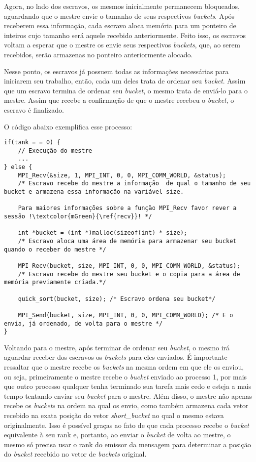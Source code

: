 			Agora, no lado dos escravos, os mesmos inicialmente permanecem bloqueados, aguardando que o mestre envie o tamanho de seus respectivos \textit{buckets}. Após receberem essa informação, cada escravo aloca memória para um ponteiro de inteiros cujo tamanho será aquele recebido anteriormente. Feito isso, os escravos voltam a esperar que o mestre os envie seus respectivos \textit{buckets}, que, ao serem recebidos, serão armazenas no ponteiro anteriormente alocado.
			
			Nesse ponto, os escravos já possuem todas as informações necessárias para iniciarem seu trabalho, então, cada um deles trata de ordenar seu \textit{bucket}. Assim que um escravo termina de ordenar seu \textit{bucket}, o mesmo trata de enviá-lo para o mestre. Assim que recebe a confirmação de que o mestre recebeu o \textit{bucket}, o escravo é finalizado.
			
			O código abaixo exemplifica esse processo:
			\begin{lstlisting}[style=C]		
if(tank = = 0) {
	// Execução do mestre
	...
} else {
	MPI_Recv(&size, 1, MPI_INT, 0, 0, MPI_COMM_WORLD, &status); 
	/* Escravo recebe do mestre a informação  de qual o tamanho de seu bucket e armazena essa informação na variável size.
	
	Para maiores informações sobre a função MPI_Recv favor rever a sessão !\textcolor{mGreen}{\ref{recv}}! */
	
	int *bucket = (int *)malloc(sizeof(int) * size); 
	/* Escravo aloca uma área de memória para armazenar seu bucket quando o receber do mestre */ 

	MPI_Recv(bucket, size, MPI_INT, 0, 0, MPI_COMM_WORLD, &status); 
	/* Escravo recebe do mestre seu bucket e o copia para a área de memória previamente criada.*/

    quick_sort(bucket, size); /* Escravo ordena seu bucket*/

    MPI_Send(bucket, size, MPI_INT, 0, 0, MPI_COMM_WORLD); /* E o envia, já ordenado, de volta para o mestre */
}
\end{lstlisting}
			
			Voltando para o mestre, após terminar de ordenar seu \textit{bucket}, o mesmo irá aguardar receber dos escravos os \textit{buckets} para eles enviados. É importante ressaltar que o mestre recebe os \textit{buckets} na mesma ordem em que ele os enviou, ou seja, primeiramente o mestre recebe o \textit{bucket} enviado ao processo 1, por mais que outro processo qualquer tenha terminado sua tarefa mais cedo e esteja a mais tempo tentando enviar seu \textit{bucket} para o mestre. Além disso, o mestre não apenas recebe os \textit{buckets} na ordem na qual os envio, como também armazena cada vetor recebido na exata posição do vetor \textit{short\_bucket} no qual o mesmo estava originalmente. Isso é possível graças ao fato de que cada processo recebe o \textit{bucket} equivalente à seu rank e, portanto, ao enviar o \textit{bucket} de volta ao mestre, o mesmo só precisa usar o rank do emissor da mensagem para determinar a posição do \textit{bucket} recebido no vetor de \textit{buckets} original.
			
